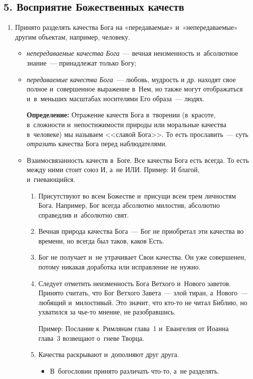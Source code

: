 \documentclass[a4paper,12pt]{article}
\begin{document}
\subsection{5. Восприятие Божественных качеств}
\begin{enumerate}
    \item Принято разделять качества Бога на «передаваемые» и~«непередаваемые» другим объектам, например, человеку.
    \begin{itemize}
        \item \emph{непередаваемые качества Бога}~--- вечная неизменность и~абсолютное знание~--- принадлежат только Богу;
        \item \emph{передаваемые качества Бога}~--- любовь, мудрость и др. находят свое полное и~совершенное выражение в~Нем, но также могут отображаться и~в~меньших масштабах носителями Его образа~--- людях. 
        
        \textbf{Определение:} Отражение качеств Бога в~творении (в~красоте, в~сложности и~непостижимости природы или моральные качества в~человеке) мы называем <<славой Бога>>. То есть прославить~--- суть \emph{отразить} качества Бога перед наблюдателями.

    \item Взаимосвязанность качеств в~Боге. Все качества Бога есть всегда. То есть между ними стоит союз И, а~не ИЛИ. Пример: И благой, и~гневающийся.

    \begin{enumerate}
        \item Присутствуют во всем Божестве и~присущи всем трем личностям Бога. Например, Бог всегда абсолютно милостив, абсолютно справедлив и~абсолютно свят.
        \item Вечная природа качества Бога~--- Бог не приобретал эти качества во времени, но всегда был таков, каков Есть.
        \item Бог не получает и~не утрачивает Свои качества. Он уже совершенен, потому никакая доработка или исправление не нужно.
        \item Следует отметить неизменность Бога Ветхого и~Нового заветов. Принято считать, что Бог Ветхого Завета~--- злой тиран, а~Нового~--- любящий и~милостивый. Это значит, что кто-то не читал Библию, но ухватился за чье-то мнение, не разобравшись. 
        
        Пример: Послание к~Римлянам глава~1 и~Евангелия от Иоанна глава~3  возвещают о~гневе Творца.
        \item Качества раскрывают и~дополняют друг друга.
        \begin{itemize}
            \item В~богословии принято различать что-то, а~не разделять. 
            

\end{itemize}
\end{enumerate}
\end{itemize}
\end{enumerate}
\end{document}
